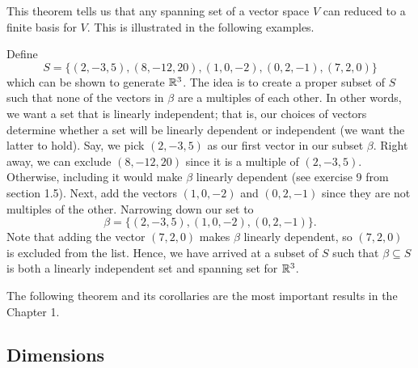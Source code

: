 This theorem tells us that any spanning set of a vector space \( V  \) can reduced to a finite basis for \( V  \). This is illustrated in the following examples.


\begin{eg}
    Define 
    \[  S = \{ (2,-3,5), (8,-12, 20), (1,0,-2), (0,2,-1), (7,2,0) \} \]
    which can be shown to generate \( \mathbb{R}^{3} \). The idea is to create a proper subset of \( S  \) such that none of the vectors in \( \beta \) are a multiples of each other. In other words, we want a set that is linearly independent; that is, our choices of vectors determine whether a set will be linearly dependent or independent (we want the latter to hold). Say, we pick \( (2,-3,5 ) \) as our first vector in our subset \( \beta \). Right away, we can exclude \( (8,-12,20) \) since it is a multiple of \( (2,-3,5) \). Otherwise, including it would make \( \beta \) linearly dependent (see exercise 9 from section 1.5). Next, add the vectors \( (1,0,-2) \) and \( (0,2,-1) \) since they are not multiples of the other. Narrowing down our set to 
    \[  \beta = \{ (2,-3,5), (1,0,-2), (0,2,-1) \}.  \]
    Note that adding the vector \( (7,2,0) \) makes \( \beta \) linearly dependent, so \( (7,2,0) \) is excluded from the list. Hence, we have arrived at a subset of \( S  \) such that \( \beta \subseteq S  \) is both a linearly independent set and spanning set for \( \mathbb{R}^{3}\).
\end{eg}

The following theorem and its corollaries are the most important results in the Chapter 1.


\subsection{Dimensions}


